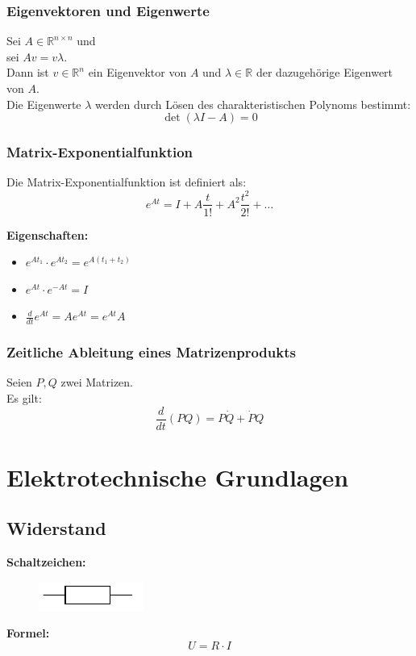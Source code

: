 \documentclass[10pt,a4paper]{article}
\begin{document}
\subsubsection{Eigenvektoren und Eigenwerte}
Sei $A \in \mathbb{R}^{n \times n}$ und \\
sei $Av = v\lambda$. \\
Dann ist $v \in \mathbb{R}^n$ ein Eigenvektor von $A$ und $\lambda \in \mathbb{R}$ der dazugehörige Eigenwert von $A$. \\

Die Eigenwerte $\lambda$ werden durch Lösen des charakteristischen Polynoms bestimmt:
$$
	\det(\lambda I - A) = 0
$$

\subsubsection{Matrix-Exponentialfunktion}
Die Matrix-Exponentialfunktion ist definiert als:
$$
	e^{At} = I + A\frac{t}{1!} + A^2 \frac{t^2}{2!} + \dots
$$

\textbf{Eigenschaften:}
\begin{itemize}
	\item $e^{At_1} ⋅ e^{At_2} = e^{A(t_1 + t_2)}$
	\item $e^{At} ⋅ e^{-At} = I$
	\item $\frac{d}{dt} e^{At} = Ae^{At} = e^{At}A$
\end{itemize}

\subsubsection{Zeitliche Ableitung eines Matrizenprodukts}
Seien $P,Q$ zwei Matrizen. \\
Es gilt:
$$
	\frac{d}{dt}(PQ) = P \dot Q + \dot P Q
$$

\section{Elektrotechnische Grundlagen}
\subsection{Widerstand}
\textbf{Schaltzeichen:} \\
\begin{figure}[H]
	\includegraphics[width=0.15\columnwidth]{imgs/widerstand.pdf}
\end{figure}
\textbf{Formel:}
$$
	U = R ⋅ I
$$
\end{document}
